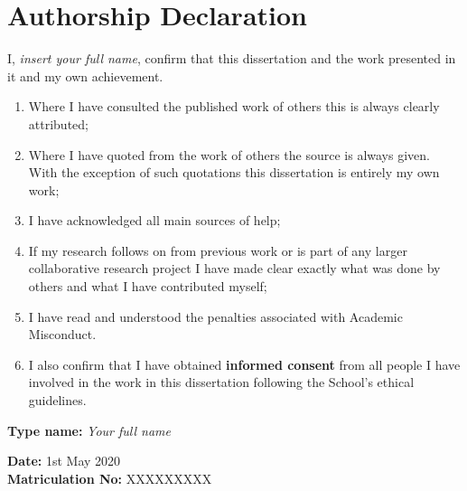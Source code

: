 \newpage
{}
\section*{Authorship Declaration}
I, \textit{insert your full name}, confirm that this dissertation and the work presented in it and my own achievement.
\begin{enumerate}
    \item Where I have consulted the published work of others this is always clearly attributed;
    \item Where I have quoted from the work of others the source is always given. With the exception of such quotations this dissertation is entirely my own work;
    \item I have acknowledged all main sources of help;
    \item If my research follows on from previous work or is part of any larger collaborative research project I have made clear exactly what was done by others and what I have contributed myself;
    \item I have read and understood the penalties associated with Academic Misconduct.
    \item I also confirm that I have obtained \textbf{informed consent} from all people I have involved in the work in this dissertation following the School's ethical guidelines.\\
\end{enumerate}


\large

\textbf{Type name:}	\textit{Your full name} 

\textbf{Date:} 1st May 2020\\

\textbf{Matriculation No:} XXXXXXXXX
\normalsize
\newpage
